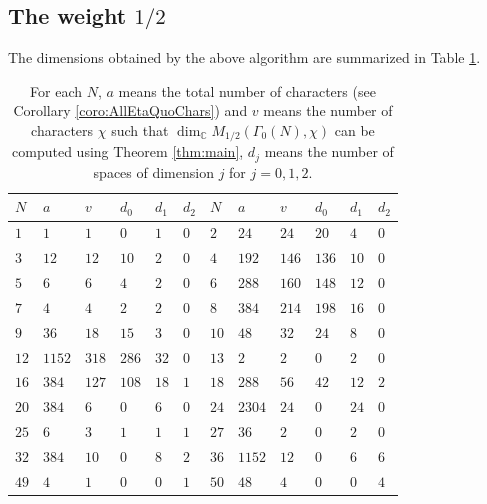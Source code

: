 \documentclass[12pt]{amsart}
\numberwithin{equation}{section}
\theoremstyle{plain}
\theoremstyle{definition}
\theoremstyle{remark}
\newcommand\numC{\mathbb{C}}
\begin{document}
\subsection{The weight $1/2$}
\label{subsec:weight1/2}
The dimensions obtained by the above algorithm are summarized in Table \ref{table:wt1/2}.
\begin{table}[ht]
\centering
\caption{For each $N$, $a$ means the total number of characters (see Corollary \ref{coro:AllEtaQuoChars}) and $v$ means the number of characters $\chi$ such that $\dim_\numC M_{1/2}(\Gamma_0(N),\chi)$ can be computed using Theorem \ref{thm:main}, $d_j$ means the number of spaces of dimension $j$ for $j=0,1,2$. \label{table:wt1/2}}
\begin{tabular}{llllll|llllll}
\toprule
$N$ & $a$ & $v$ & $d_0$ & $d_1$ & $d_2$ & $N$ & $a$ & $v$ & $d_0$ & $d_1$ & $d_2$ \\
\midrule
$1$ & $1$ & $1$ & $0$ & $1$ & $0$ & $2$ & $24$ & $24$ & $20$ & $4$ & $0$\\
$3$ & $12$ & $12$ & $10$ & $2$ & $0$ & $4$ & $192$ & $146$ & $136$ & $10$ & $0$\\
$5$ & $6$ & $6$ & $4$ & $2$ & $0$ & $6$ & $288$ & $160$ & $148$ & $12$ & $0$\\
$7$ & $4$ & $4$ & $2$ & $2$ & $0$ & $8$ & $384$ & $214$ & $198$ & $16$ & $0$\\
$9$ & $36$ & $18$ & $15$ & $3$ & $0$ & $10$ & $48$ & $32$ & $24$ & $8$ & $0$\\
$12$ & $1152$ & $318$ & $286$ & $32$ & $0$ & $13$ & $2$ & $2$ & $0$ & $2$ & $0$\\
$16$ & $384$ & $127$ & $108$ & $18$ & $1$ & $18$ & $288$ & $56$ & $42$ & $12$ & $2$\\
$20$ & $384$ & $6$ & $0$ & $6$ & $0$ & $24$ & $2304$ & $24$ & $0$ & $24$ & $0$\\
$25$ & $6$ & $3$ & $1$ & $1$ & $1$ & $27$ & $36$ & $2$ & $0$ & $2$ & $0$\\
$32$ & $384$ & $10$ & $0$ & $8$ & $2$ & $36$ & $1152$ & $12$ & $0$ & $6$ & $6$\\
$49$ & $4$ & $1$ & $0$ & $0$ & $1$ & $50$ & $48$ & $4$ & $0$ & $0$ & $4$\\
\bottomrule
\end{tabular}
\end{table}
\end{document}
